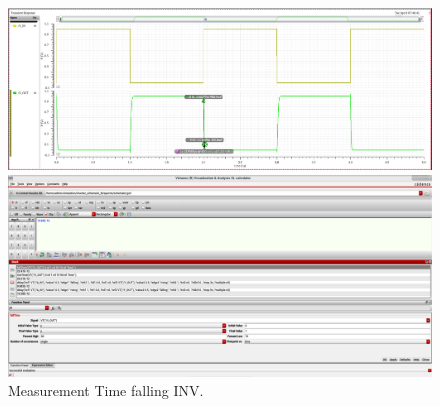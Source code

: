 \begin{figure}[H]
	\begin{minipage}{0.5\linewidth}
		\includegraphics[width=\linewidth]{section/EX1/INV/EX1_INV_Tf_Waveform.png}
	\end{minipage}
	\begin{minipage}{0.5\linewidth}
		\includegraphics[width=\linewidth]{section/EX1/INV/EX1_INV_Tf_Cal.png}
	\end{minipage}
	\caption{Measurement Time falling INV.}
\end{figure}

